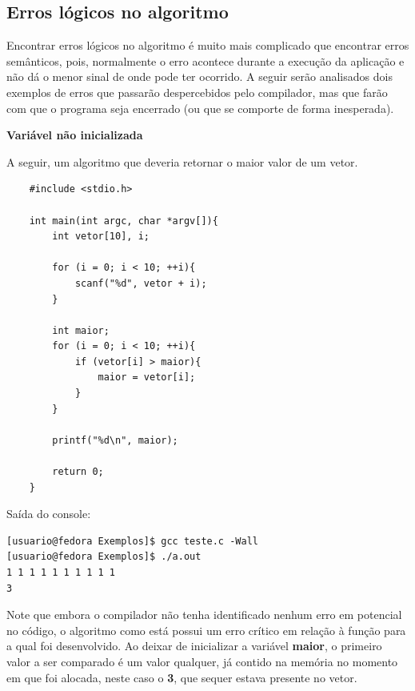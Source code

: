 \documentclass[12pt]{article}
\newcommand\tab[1][1cm]{\hspace*{#1}}
\begin{document}
\subsection{Erros lógicos no algoritmo}

\par\tab Encontrar erros lógicos no algoritmo é muito mais complicado que encontrar erros semânticos, pois, normalmente o erro acontece durante a execução da aplicação e não dá o menor sinal de onde pode ter ocorrido. A seguir serão analisados dois exemplos de erros que passarão despercebidos pelo compilador, mas que farão com que o programa seja encerrado (ou que se comporte de forma inesperada).

\hspace{2cm}
\par\tab\textbf{Variável não inicializada}

\par\tab A seguir, um algoritmo que deveria retornar o maior valor de um vetor.

\hspace{0.25cm}
\begin{lstlisting}
    #include <stdio.h>
    
    int main(int argc, char *argv[]){
        int vetor[10], i;
        
        for (i = 0; i < 10; ++i){
            scanf("%d", vetor + i);
        }
        
        int maior;
        for (i = 0; i < 10; ++i){
            if (vetor[i] > maior){
                maior = vetor[i];
            }
        }
        
        printf("%d\n", maior);
        
        return 0;
    }
\end{lstlisting}

\par\tab Saída do console:

\hspace{0.25cm}
\begin{tcolorbox}[colback=black!5!white,colframe=black!75!white,title=Console: usuario@fedora:\~/Exemplos]
    \begin{verbatim}
[usuario@fedora Exemplos]$ gcc teste.c -Wall
[usuario@fedora Exemplos]$ ./a.out
1 1 1 1 1 1 1 1 1 1
3
    \end{verbatim}
\end{tcolorbox}

\par\tab Note que embora o compilador não tenha identificado nenhum erro em potencial no código, o algoritmo como está possui um erro crítico em relação à função para a qual foi desenvolvido. Ao deixar de inicializar a variável \textbf{maior}, o primeiro valor a ser comparado é um valor qualquer, já contido na memória no momento em que foi alocada, neste caso o \textbf{3}, que sequer estava presente no vetor.
\end{document}
